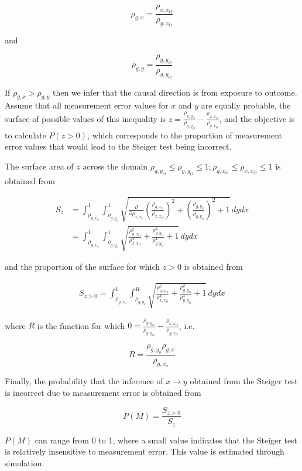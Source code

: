 \documentclass[]{article}
\begin{document}
\[
\rho_{g,x} = \frac{\rho_{x,x_O}}{\rho_{g,x_O}}
\]

and

\[
\rho_{g,y} = \frac{\rho_{y,y_O}}{\rho_{g,y_O}}
\]

If \(\rho_{g,x} > \rho_{g,y}\) then we infer that the causal direction
is from exposure to outcome. Assume that all measurement error values
for \(x\) and \(y\) are equally probable, the surface of possible values
of this inequality is
\(z = \frac{\rho_{y,y_O}}{\rho_{g,y_O}} - \frac{\rho_{x,x_O}}{\rho_{g,x_O}}\),
and the objective is to calculate \(P(z > 0)\), which corresponds to the
proportion of measurement error values that would lead to the Steiger
test being incorrect.

The surface area of \(z\) across the domain
\(\rho_{g,y_O} \leq \rho_{y,y_O} \leq 1; \rho_{g,x_O} \leq \rho_{x,x_O} \leq 1\)
is obtained from

\[
\begin{aligned}
S_z & = \int^1_{\rho_{g,x_o}} \int^1_{\rho_{g,y_o}} \sqrt{  \frac{\partial}{\partial \rho_{x,x_o}} \left (\frac{\rho_{g,x_O}}{\rho_{x,x_O}} \right )^2 +  \left (\frac{\rho_{g,y_O}}{\rho_{y,y_O}} \right )^2   +1 }\, dydx \\
& = \int^1_{\rho_{g,x_o}} \int^1_{\rho_{g,y_o}} \sqrt{ \frac{\rho_{g,x_O}^2}{\rho_{x,x_O}^4} + \frac{\rho_{g,y_O}^2}{\rho_{y,y_O}^4} + 1}\, dydx
\end{aligned}
\]

and the proportion of the surface for which \(z > 0\) is obtained from

\[
\begin{aligned}
S_{z>0} = \int^1_{\rho_{g,x_o}} \int^{R}_{\rho_{g,y_o}} \sqrt{ \frac{\rho_{g,x_O}^2}{\rho_{x,x_O}^4} + \frac{\rho_{g,y_O}^2}{\rho_{y,y_O}^4} + 1}\, dydx
\end{aligned}
\]

where \(R\) is the function for which
\(0 = \frac{\rho_{y,y_O}}{\rho_{g,y_O}} - \frac{\rho_{x,x_O}}{\rho_{g,x_O}}\),
i.e.

\[
R = \frac{\rho_{g,y_o}\rho_{g,x}}{\rho_{g,x_o}}
\]

Finally, the probability that the inference of \(x \rightarrow y\)
obtained from the Steiger test is incorrect due to measurement error is
obtained from

\[
P(M) = \frac{S_{z>0}}{S_z}
\]

\(P(M)\) can range from 0 to 1, where a small value indicates that the
Steiger test is relatively insensitive to measurement error. This value
is estimated through simulation.
\end{document}
